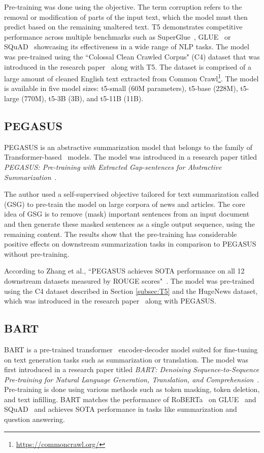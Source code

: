 \documentclass[english, ba, kiv, he, iso690numb, pdf, viewonly]{fasthesis}
\begin{document}
Pre-training was done using the  objective. 
The term corruption refers to the removal or modification of parts of the input text, which the model must then predict based on the remaining unaltered text. T5 demonstrates competitive performance across multiple benchmarks such as SuperGlue~\cite{wang2020superglue}, GLUE~\cite{wang-etal-2018-glue} or SQuAD~\cite{rajpurkar2016squad} showcasing its effectiveness in a wide range of NLP tasks. The model was pre-trained using the “Colossal Clean Crawled Corpus" (C4) dataset that was introduced in the research paper~\cite{2020t5} along with T5. The dataset is comprised of a large amount of cleaned English text extracted from Common Crawl\footnote{\url{https://commoncrawl.org/}}. 
The model is available in five model sizes: t5-small (60M parameters), t5-base (228M), t5-large (770M), t5-3B (3B), and t5-11B (11B).
\subsection{PEGASUS}\label{subsec:pegasus}
PEGASUS is an abstractive summarization model that belongs to the family of Transformer-based~\cite{vaswani2023attention} models. The model was introduced in a research paper titled \textit{PEGASUS: Pre-training with Extracted Gap-sentences for Abstractive Summarization}~\cite{zhang2019pegasus}. 

The author used a self-supervised objective tailored for text summarization called  (GSG) to pre-train the model on large corpora of news and articles. The core idea of GSG is to remove (mask) important sentences from an input document and then generate these masked sentences as a single output sequence, using the remaining content. The results show that the pre-training has considerable positive effects on downstream summarization tasks in comparison to PEGASUS without pre-training. 

According to Zhang et al., “PEGASUS achieves SOTA performance on all 12 downstream datasets measured by ROUGE scores"~\cite{zhang2019pegasus}. The model was pre-trained using the C4 dataset described in Section \ref{subsec:T5} and the HugeNews dataset, which was introduced in the research paper~\cite{zhang2019pegasus} along with PEGASUS.
\subsection{BART} \label{subsec:BART}
BART is a pre-trained transformer~\cite{vaswani2023attention} encoder-decoder model suited for fine-tuning on text generation tasks such as summarization or translation. The model was first introduced in a research paper titled \textit{BART: Denoising Sequence-to-Sequence Pre-training for Natural Language Generation, Translation, and Comprehension}~\cite{lewis2019bart}. Pre-training is done using various methods such as token masking, token deletion, and text infilling. BART matches the performance of RoBERTa~\cite{liu2019roberta} on GLUE~\cite{wang-etal-2018-glue} and SQuAD~\cite{rajpurkar2016squad} and achieves SOTA performance in tasks like summarization and question answering.
\end{document}
